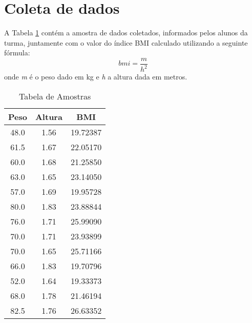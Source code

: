 \documentclass[12pt, a4paper]{article}
\begin{document}
\section{Coleta de dados}
A Tabela \ref{table:amostra} contém a amostra de dados coletados, informados pelos alunos da turma, juntamente com o valor do índice BMI calculado utilizando a seguinte fórmula:
\begin{equation}
bmi = \frac{m}{h^{2}}
\end{equation}
\newline onde \textit{m} é o peso dado em kg e \textit{h} a altura dada em metros.
	
\begin{table}
\centering
\begin{tabular}{|c|c|c|}
\hline
\rule[-1.0ex]{0pt}{4.0ex}
\textbf{Peso}&\textbf{Altura}&\textbf{BMI}\\ \hline
\rule[-1.0ex]{0pt}{4.0ex}
48.0   &	1.56	&	19.72387 \\ \hline
\rule[-1.0ex]{0pt}{4.0ex}
61.5   &	1.67	&	22.05170 \\ \hline
\rule[-1.0ex]{0pt}{4.0ex}
60.0   & 	1.68	&	21.25850 \\ \hline
\rule[-1.0ex]{0pt}{4.0ex}
63.0   &	1.65	&	23.14050 \\ \hline
\rule[-1.0ex]{0pt}{4.0ex}
57.0   &	1.69	&	19.95728 \\ \hline
\rule[-1.0ex]{0pt}{4.0ex}
80.0   &	1.83	&	23.88844 \\ \hline
\rule[-1.0ex]{0pt}{4.0ex}
76.0   &	1.71	&	25.99090 \\ \hline
\rule[-1.0ex]{0pt}{4.0ex}
70.0   &	1.71	&	23.93899 \\ \hline
\rule[-1.0ex]{0pt}{4.0ex}
70.0   &	1.65	&	25.71166 \\ \hline
\rule[-1.0ex]{0pt}{4.0ex}
66.0   &	1.83	&	19.70796 \\ \hline
\rule[-1.0ex]{0pt}{4.0ex}
52.0   &	1.64	&	19.33373 \\ \hline
\rule[-1.0ex]{0pt}{4.0ex}
68.0   &	1.78	&	21.46194 \\ \hline
\rule[-1.0ex]{0pt}{4.0ex}
82.5   &	1.76	&	26.63352 \\ \hline
\end{tabular}
\caption{Tabela de Amostras}
\label{table:amostra}
\end{table}
\end{document}
